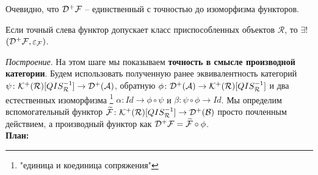 \documentclass[../main.tex]{subfiles}
\begin{document}
\begin{to_com}
Очевидно, что $\mathcal{D^+ \mathcal{F}}$ -- единственный с точностью до изоморфизма функторов.
\end{to_com}
\begin{to_thr}
Если точный слева функтор допускает класс приспособленных объектов $\mathcal{R}$, то $\exists !$ $(\mathcal{D^+ \mathcal{F}}, \varepsilon_{\mathcal{F}})$.
\end{to_thr}
\textit{Построение}. На этом шаге мы показываем \textbf{точность в смысле производной категории}.
     Будем использовать полученную ранее эквивалентность категорий $\psi\colon \mathcal{K^+(\mathcal{R})}[QIS_{\mathcal{R}}^{-1}]\to \mathcal{D^+(\mathcal{A})}$, обратную $\phi \colon \mathcal{D^+(\mathcal{A})} \to \mathcal{K^+(\mathcal{R})}[QIS_{\mathcal{R}}^{-1}]$ и два естественных изоморфизма \footnote{"единица и коединица сопряжения"} $\alpha\colon Id \to \phi \circ \psi$ и $\beta \colon \psi \circ \phi \to Id$. Мы определим вспомогательный функтор  $\widetilde{\mathcal{F}}\colon \mathcal{K^+(\mathcal{R})}[QIS_{\mathcal{R}}^{-1}]\to \mathcal{D^+(\mathcal{B})}$ просто почленным действием, а производный функтор как $\mathcal{D^+ \mathcal{F}} = \widetilde{\mathcal{F}} \circ \phi$.
     \\
\textbf{План:} %
\end{document}
